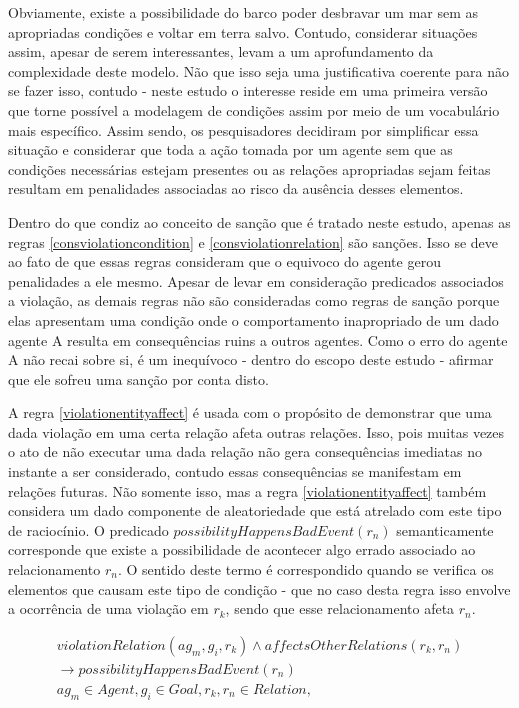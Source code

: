 Obviamente, existe a possibilidade do barco poder desbravar um mar sem as apropriadas condições e voltar em terra salvo. Contudo, considerar situações assim, apesar de serem interessantes, levam a um aprofundamento da complexidade deste modelo. Não que isso seja uma justificativa coerente para não se fazer isso, contudo - neste estudo o interesse reside em uma primeira versão que torne possível a modelagem de condições assim por meio de um vocabulário mais específico. Assim sendo, os pesquisadores decidiram por simplificar essa situação e considerar que toda a ação tomada por um agente sem que as condições necessárias estejam presentes ou as relações apropriadas sejam feitas resultam em penalidades associadas ao risco da ausência desses elementos.  

Dentro do que condiz ao conceito de sanção que é tratado neste estudo, apenas as regras \ref{consviolationcondition} e \ref{consviolationrelation} são sanções. Isso se deve ao fato de que essas regras consideram que o equivoco do agente gerou penalidades a ele mesmo. Apesar de levar em consideração predicados associados a violação, as demais regras não são consideradas como regras de sanção porque elas apresentam uma condição onde o comportamento inapropriado de um dado agente A resulta em consequências ruins a outros agentes. Como o erro do agente A não recai sobre si, é um inequívoco - dentro do escopo deste estudo - afirmar que ele sofreu uma sanção por conta disto. 


A regra \ref{violationentityaffect} é usada com o propósito de demonstrar que uma dada violação em uma certa relação afeta outras relações. Isso, pois muitas vezes o ato de não executar uma dada relação não gera consequências imediatas no instante a ser considerado, contudo essas consequências se manifestam em relações futuras. Não somente isso, mas a regra \ref{violationentityaffect} também considera um dado componente de aleatoriedade que está atrelado com este tipo de raciocínio. O predicado $possibilityHappensBadEvent(r_n)$ semanticamente corresponde que existe a possibilidade de acontecer algo errado associado ao relacionamento $r_n$. O sentido deste termo é correspondido quando se verifica os elementos que causam este tipo de condição - que no caso desta regra isso envolve a ocorrência de uma violação em $r_k$, sendo que esse relacionamento afeta $r_n$.


\begin{eqnarray}\label{violationentityaffect}
	violationRelation(ag_m,g_i,r_k) \wedge affectsOtherRelations(r_k,r_n) \nonumber \\
    \to possibilityHappensBadEvent(r_n)  \nonumber \\
    ag_m \in Agent, g_i \in Goal, r_k,r_n \in Relation, 
\end{eqnarray}

